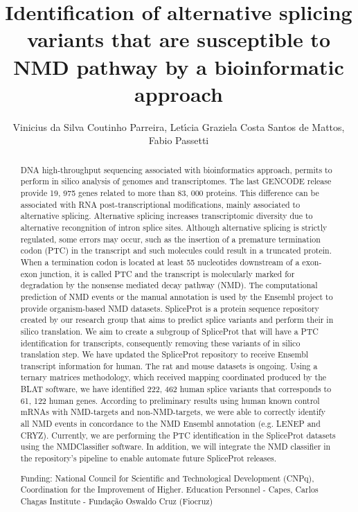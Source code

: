 \documentclass[twoside]{article}
\title{\vspace{-15mm}\fontsize{24pt}{10pt}\selectfont\textbf{ Identification of alternative splicing variants that are susceptible to NMD pathway by a bioinformatic approach }} %
\author{ Vinicius da Silva Coutinho Parreira, Let\'{\i}cia Graziela Costa Santos de Mattos, Fabio Passetti }
\affil{ Laboratory of Gene Expression Regulation,  Carlos Chagas Institute,  Funda\c{c}\~ao Oswaldo Cruz (Fiocruz),  Curitiba,  PR,  Brazil }
\date{}
\begin{document}
  
  
  \maketitle %
  
  
  \thispagestyle{fancy} %
  
  
  \begin{abstract}
  DNA high-throughput sequencing associated with bioinformatics approach,  permits to perform in silico analysis of genomes and transcriptomes. The last GENCODE release provide 19, 975 genes related to more than 83, 000 proteins. This difference can be associated with RNA post-transcriptional modifications,  mainly associated to alternative splicing. Alternative splicing increases transcriptomic diversity due to alternative recongnition of intron splice sites. Although alternative splicing is strictly regulated,  some errors may occur,  such as the insertion of a premature termination codon (PTC) in the transcript and such molecules could result in a truncated protein. When a termination codon is located at least 55 nucleotides downstream of a exon-exon junction,  it is called PTC and the transcript is molecularly marked for degradation by the nonsense mediated decay pathway (NMD). The computational prediction of NMD events or the manual annotation is used by the Ensembl project to provide organism-based NMD datasets. SpliceProt is a protein sequence repository created by our research group that aims to predict splice variants and perform their in silico translation. We aim to create a subgroup of SpliceProt that will have a PTC identification for transcripts,  consequently removing these variants of in silico translation step. We have updated the SpliceProt repository to receive Ensembl transcript information for human. The rat and mouse datasets is ongoing. Using a ternary matrices methodology,  which received mapping coordinated produced by the BLAT software,  we have identified 222, 462 human splice variants that corresponds to 61, 122 human genes. According to preliminary results using human known control mRNAs with NMD-targets and non-NMD-targets,  we were able to correctly identify all NMD events in concordance to the  NMD Ensembl annotation (e.g. LENEP and CRYZ). Currently,  we are performing the PTC identification in the SpliceProt datasets using the NMDClassifier software. In addition,  we will integrate the NMD classifier in the repository’s pipeline to enable automate future SpliceProt releases.
  
  Funding: National Council for Scientific and Technological Development (CNPq),  Coordination for the Improvement of Higher. Education Personnel - Capes,  Carlos Chagas Institute - Funda\c{c}\~ao Oswaldo Cruz (Fiocruz) \\ 
  \end{abstract}
  
\end{document}
